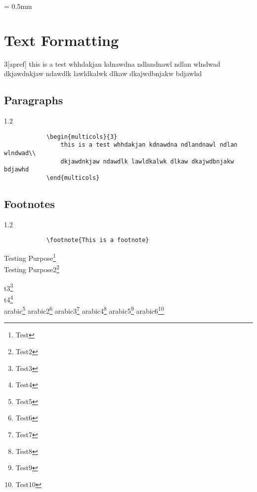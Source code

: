 \documentclass[a4paper, 10pt]{book}
\begin{document}
    \tableofcontents
    \columnseprule = 0.5mm

    \chapter[Text Formatting]{Text Formatting}
    \begin{multicols}{3}[apref]
        this is a test whhdakjan kdnawdna ndlandnawl ndlan wlndwad\\
        dkjawdnkjaw ndawdlk lawldkalwk dlkaw dkajwdbnjakw bdjawhd
    \end{multicols}
    \section[Paragraphs]{Paragraphs}

    \begin{boxedminipage}[h]{1.2\textwidth} %
        \begin{verbatim}
            \begin{multicols}{3}
                this is a test whhdakjan kdnawdna ndlandnawl ndlan wlndwad\\
                dkjawdnkjaw ndawdlk lawldkalwk dlkaw dkajwdbnjakw bdjawhd
            \end{multicols}
        \end{verbatim}
    \end{boxedminipage}

    \section[Footnotes]{Footnotes}
    \begin{boxedminipage}[h]{1.2\textwidth} %
        \begin{verbatim}
            \footnote{This is a footnote}
        \end{verbatim}
    \end{boxedminipage}
    {Testing Purpose}\footnote{Test} \\
    {Testing Purpose2}\footnote[1]{Test2}  %

    \renewcommand{\thefootnote}{\fnsymbol{footnote}} %
    t3\footnote{Test3} \\
    t4\footnote{Test4} \\
    arabic\footnote{Test5}
    arabic2\footnote{Test6}
    arabic3\footnote{Test7}
    arabic4\footnote{Test8}
    arabic5\footnote{Test9}
    arabic6\footnote{Test10}
    \renewcommand{\footnote}{\endnote}  %
\end{document}
